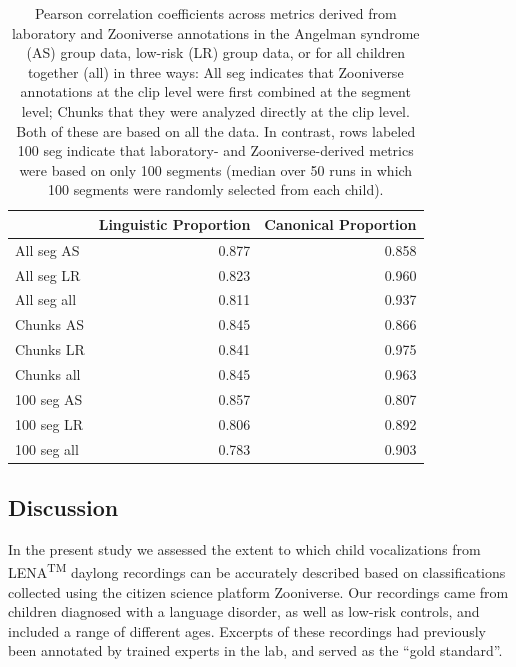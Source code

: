 \documentclass[english,,man,floatsintext]{apa6}
\begin{document}
\begin{table}

\caption{\label{tab:tab-cors}Pearson correlation coefficients across metrics derived from laboratory and Zooniverse annotations in the Angelman syndrome (AS) group data, low-risk (LR) group data, or for all children together (all) in three ways: All seg indicates that Zooniverse annotations at the clip level were first combined at the segment level; Chunks that they were analyzed directly at the clip level. Both of these are based on all the data. In contrast, rows labeled 100 seg indicate that laboratory- and Zooniverse-derived metrics were based on only 100 segments (median over 50 runs in which 100 segments were randomly selected from each child).}
\centering
\begin{tabular}[t]{l|r|r}
\hline
  & Linguistic Proportion & Canonical Proportion\\
\hline
All seg AS & 0.877 & 0.858\\
\hline
All seg LR & 0.823 & 0.960\\
\hline
All seg all & 0.811 & 0.937\\
\hline
Chunks AS & 0.845 & 0.866\\
\hline
Chunks LR & 0.841 & 0.975\\
\hline
Chunks all & 0.845 & 0.963\\
\hline
100 seg AS & 0.857 & 0.807\\
\hline
100 seg LR & 0.806 & 0.892\\
\hline
100 seg all & 0.783 & 0.903\\
\hline
\end{tabular}
\end{table}

\hypertarget{discussion}{%
\subsection{Discussion}\label{discussion}}

In the present study we assessed the extent to which child vocalizations from LENA\textsuperscript{TM} daylong recordings can be accurately described based on classifications collected using the citizen science platform Zooniverse. Our recordings came from children diagnosed with a language disorder, as well as low-risk controls, and included a range of different ages. Excerpts of these recordings had previously been annotated by trained experts in the lab, and served as the \enquote{gold standard}.
\end{document}
